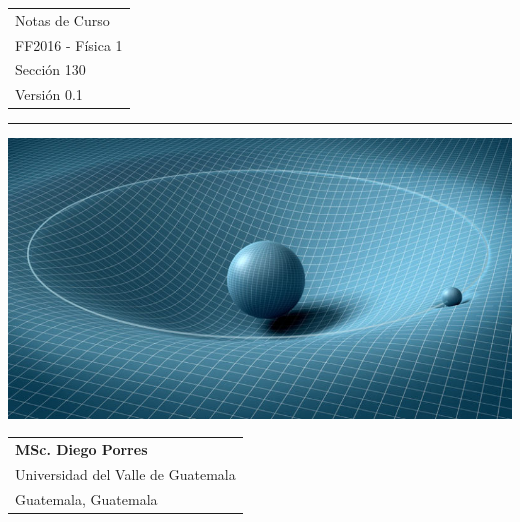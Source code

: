 \documentclass{book}
\begin{document}
\thispagestyle{empty}

\vspace{2pt}
\begin{flushright}
\Huge
\begin{tabular}{@{}l}
Notas de Curso\\
FF2016 - F\'isica 1\\
Secci\'on 130\\[6pt]
{\Large Versi\'on 0.1}
\end{tabular}
\end{flushright}
\rule{\textwidth}{1pt}
\vspace{30px}

\begin{center}
    \includegraphics[width=\textwidth]{grel.jpg}
\end{center}
\vfill

\begin{flushleft}
\large\itshape
\begin{tabular}{@{}l}
{\Large\upshape\bfseries MSc. Diego Porres}\\[8pt]
Universidad del Valle de Guatemala\\[5pt]
Guatemala, Guatemala\\[5pt]
\end{tabular}
\end{flushleft}
\newpage
%
\thispagestyle{empty}
\vspace*{\fill}
\end{document}
